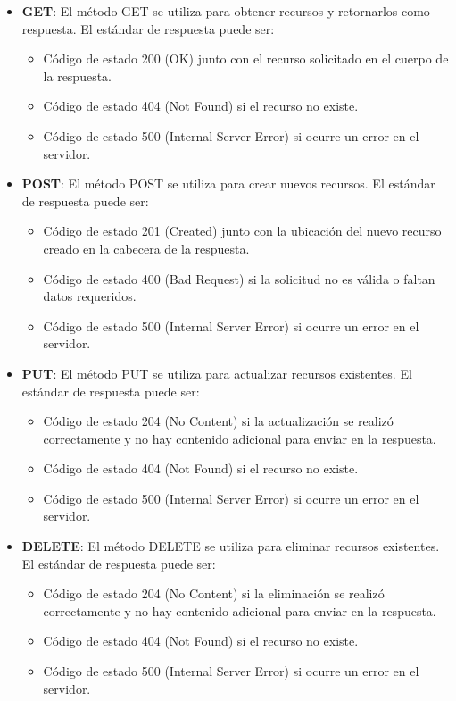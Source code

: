 \documentclass[executivepaper]{article}
\begin{document}
\begin{itemize}
\item \textbf{GET}: El método GET se utiliza para obtener recursos y retornarlos como respuesta. El estándar de respuesta puede ser:

\begin{itemize}
\item Código de estado 200 (OK) junto con el recurso solicitado en el cuerpo de la respuesta.
\item Código de estado 404 (Not Found) si el recurso no existe.
\item Código de estado 500 (Internal Server Error) si ocurre un error en el servidor.
\end{itemize}

\item \textbf{POST}: El método POST se utiliza para crear nuevos recursos. El estándar de respuesta puede ser:

\begin{itemize}
\item Código de estado 201 (Created) junto con la ubicación del nuevo recurso creado en la cabecera de la respuesta.
\item Código de estado 400 (Bad Request) si la solicitud no es válida o faltan datos requeridos.
\item Código de estado 500 (Internal Server Error) si ocurre un error en el servidor.
\end{itemize}

\item \textbf{PUT}: El método PUT se utiliza para actualizar recursos existentes. El estándar de respuesta puede ser:

\begin{itemize}
\item Código de estado 204 (No Content) si la actualización se realizó correctamente y no hay contenido adicional para enviar en la respuesta.
\item Código de estado 404 (Not Found) si el recurso no existe.
\item Código de estado 500 (Internal Server Error) si ocurre un error en el servidor.
\end{itemize}

\item \textbf{DELETE}: El método DELETE se utiliza para eliminar recursos existentes. El estándar de respuesta puede ser:

\begin{itemize}
\item Código de estado 204 (No Content) si la eliminación se realizó correctamente y no hay contenido adicional para enviar en la respuesta.
\item Código de estado 404 (Not Found) si el recurso no existe.
\item Código de estado 500 (Internal Server Error) si ocurre un error en el servidor.
\end{itemize}

\end{itemize}
\end{document}
